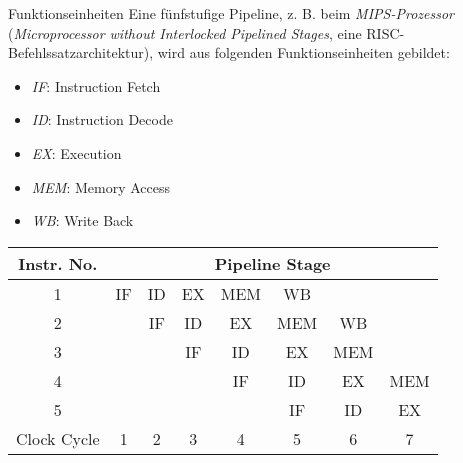 \begin{defi}[Pipelining]{Funktionseinheiten}
    Eine fünfstufige Pipeline, z. B. beim \emph{MIPS-Prozessor} (\emph{Microprocessor without Interlocked Pipelined Stages}, eine RISC-Befehlssatzarchitektur), wird aus folgenden Funktionseinheiten gebildet:
    \begin{itemize}
        \item \emph{IF}: Instruction Fetch
        \item \emph{ID}: Instruction Decode
        \item \emph{EX}: Execution
        \item \emph{MEM}: Memory Access
        \item \emph{WB}: Write Back
    \end{itemize}
    
    \centering
    \begin{tabular}{|c|c|c|c|c|c|c|c|}
        \toprule
        Instr. No.  & \multicolumn{7}{c|}{Pipeline Stage}                                   \\
        \toprule
        1           & IF                                  & ID & EX & MEM & WB  &     &     \\
        \midrule
        2           &                                     & IF & ID & EX  & MEM & WB  &     \\
        \midrule
        3           &                                     &    & IF & ID  & EX  & MEM &     \\
        \midrule
        4           &                                     &    &    & IF  & ID  & EX  & MEM \\
        \midrule
        5           &                                     &    &    &     & IF  & ID  & EX  \\
        \midrule
        \midrule
        Clock Cycle & 1                                   & 2  & 3  & 4   & 5   & 6   & 7   \\
        \bottomrule
    \end{tabular}
\end{defi}

